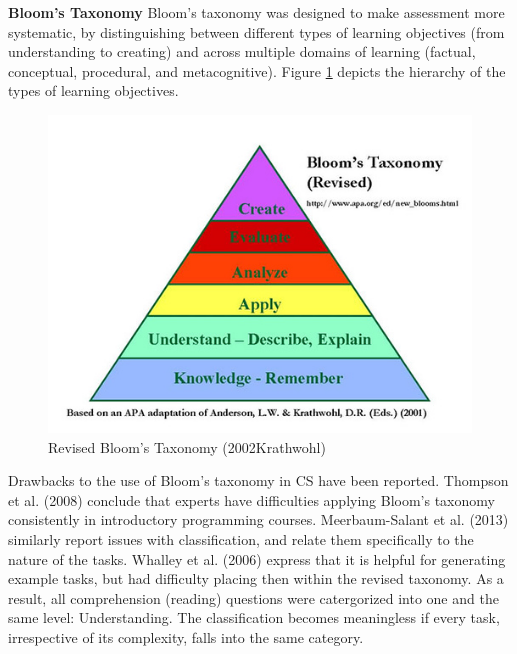 \textbf{Bloom's Taxonomy}\newline
Bloom's taxonomy was designed to make assessment more systematic, by distinguishing between different types of learning objectives (from understanding to creating) and across multiple domains of learning (factual, conceptual, procedural, and metacognitive). Figure \ref{fig:BloomsRevised} depicts the hierarchy of the types of learning objectives.


\begin{figure}
\includegraphics[scale=0.6]{figures/bloomsrevised.jpg}
\caption{Revised Bloom's Taxonomy (2002Krathwohl)}\label{fig:BloomsRevised}
\end{figure}


Drawbacks to the use of Bloom's taxonomy in CS have been reported. Thompson et al. (2008) conclude that experts have difficulties applying Bloom's taxonomy consistently in introductory programming courses. Meerbaum-Salant et al. (2013) similarly report issues with classification, and relate them specifically to the nature of the tasks. Whalley et al. (2006) express that it is helpful for generating example tasks, but had difficulty placing then within the revised taxonomy. As a result, all comprehension (reading) questions were catergorized into one and the same level: Understanding. The classification becomes meaningless if every task, irrespective of its complexity, falls into the same category.


